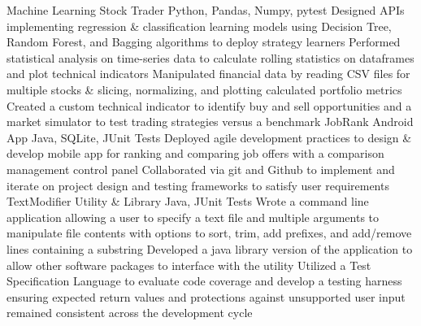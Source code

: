 %
%
%
%
%
\justifiedsubsection%
{Machine Learning Stock Trader}
{Python, Pandas, Numpy, pytest}
%
\workitemsFour%
{Designed APIs implementing regression \& classification learning models using Decision Tree, Random Forest, and Bagging algorithms to deploy strategy learners}
{Performed statistical analysis on time-series data to calculate rolling statistics on dataframes and plot technical indicators}
{Manipulated financial data by reading CSV files for multiple stocks \& slicing, normalizing, and plotting calculated portfolio metrics}
{Created a custom technical indicator to identify buy and sell opportunities and a market simulator to test trading strategies versus a benchmark}
%
%
%
%
\justifiedsubsection%
{JobRank Android App}
{Java, SQLite, JUnit Tests}
%
\workitemsTwo%
{Deployed agile development practices to design \& develop mobile app for ranking and comparing job offers with a comparison management control panel}
{Collaborated via git and Github to implement and iterate on project design and testing frameworks to satisfy user requirements}
%
%
%
%
\justifiedsubsection%
{TextModifier Utility \& Library}
{Java, JUnit Tests}
%
\workitemsThree%
{Wrote a command line application allowing a user to specify a text file and multiple arguments to manipulate file contents with options to sort, trim, add prefixes, and add/remove lines containing a substring}
{Developed a java library version of the application to allow other software packages to interface with the utility}
{Utilized a Test Specification Language to evaluate code coverage and develop a testing harness ensuring expected return values and protections against unsupported user input remained consistent across the development cycle}
%
%
%
%
%
%
%
%